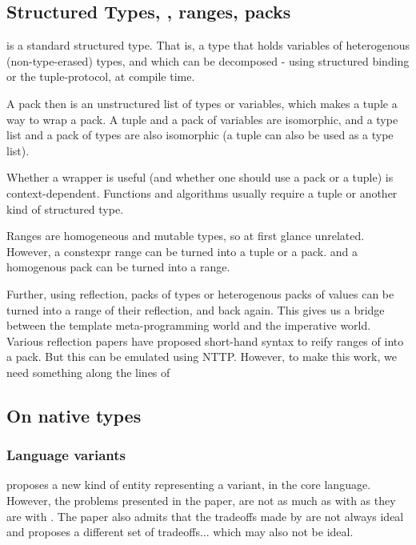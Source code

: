 \documentclass{wg21}
\begin{document}
\subsection{Structured Types, , ranges, packs}

 is a standard structured type. That is, a type that holds variables of heterogenous (non-type-erased) types,
and which can be decomposed - using structured binding or the tuple-protocol, at compile time.

A pack then is an unstructured list of types or variables, which makes a tuple a way to wrap a pack.
A tuple and a pack of variables are isomorphic, and a type list and a pack of types are also isomorphic (a tuple can also be used as a type list).

Whether a wrapper is useful (and whether one should use a pack or a tuple) is context-dependent.
Functions and algorithms usually require a tuple or another kind of structured type.

Ranges are homogeneous and mutable types, so at first glance unrelated.
However, a constexpr range can be turned into a tuple or a pack. and a homogenous pack can be turned into a range.

Further, using reflection, packs of types or heterogenous packs of values can be turned into a range of their reflection, and back again.
This gives us a bridge between the template meta-programming world and the imperative world.
Various reflection papers have proposed short-hand syntax to reify ranges of  into a pack.
But this can be emulated using NTTP.
However, to make this work, we need something along the lines of 

\subsection{On native types}

\subsubsection{Language variants}

 proposes a new kind of entity representing a variant, in the core language.
However, the problems presented in the paper, are not as much as with  as they are with .
The paper also admits that the tradeoffs made by  are not always ideal and proposes a different set of tradeoffs... which may also not be ideal.
\end{document}
